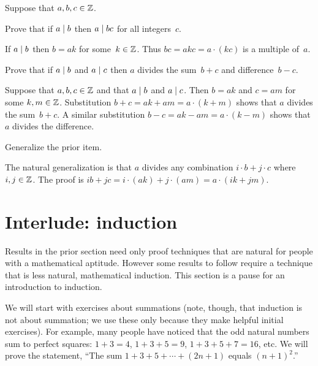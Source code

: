 \documentclass{ibl}  %
\begin{document}
\begin{problem} \label{ex:DividesAndLinearCombinations}
Suppose that $a,b,c\in\mathbb{Z}$.
\begin{exes}
\begin{exercise}
  Prove that if $a\mid b$ then $a\mid bc$ for all integers~$c$.
\end{exercise}
\begin{answer}
  If $a\mid b$ then $b=ak$ for some~$k\in\mathbb{Z}$.
  Thus $bc=akc=a\cdot(kc)$ is a multiple of~$a$.
\end{answer}
\begin{exercise}
  Prove that if $a\mid b$ and $a\mid c$ then $a$ divides the 
  sum~$b+c$ and difference~$b-c$.
\end{exercise}
\begin{answer}
  Suppose that $a,b,c\in\mathbb{Z}$ and that $a\mid b$ and $a\mid c$.
  Then $b=ak$ and $c=am$ for some $k,m\in\mathbb{Z}$. 
  Substitution  
  $b+c=ak+am=a\cdot(k+m)$
  shows that $a$ divides the sum~$b+c$.
  A similar substitution
  $b-c=ak-am=a\cdot(k-m)$
  shows that $a$ divides the difference.
\end{answer}
\begin{exercise}  %
   Generalize the prior item.
\end{exercise}
\begin{answer}
  The natural generalization is that $a$ divides any combination
  $i\cdot b+j\cdot c$ where $i,j\in\mathbb{Z}$.
  The proof is
  $ib+jc=i\cdot (ak)+j\cdot(am)=a\cdot(ik+jm)$.
\end{answer}
\end{exes}
\end{problem}




\section{Interlude: induction}
Results in the prior section need only proof techniques that are natural
for people with a mathematical aptitude.
However some results to follow require a technique 
that is less natural, mathematical induction.
This section is a pause for an introduction to induction.

We will start with exercises about summations 
(note, though, that induction is not about summation;
we use these only because they make helpful initial exercises).
For example, many people have noticed that the odd natural numbers sum to 
perfect squares: $1+3=4$, $1+3+5=9$, $1+3+5+7=16$, etc.
We will prove the statement,
``The sum $1+3+5+\cdots+(2n+1)$ equals $(n+1)^2$.'' 
\end{document}
